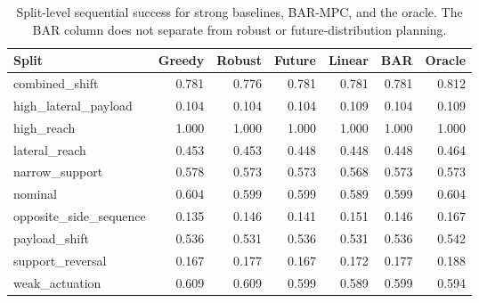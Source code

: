 \begin{table}[t]
\centering
\caption{Split-level sequential success for strong baselines, BAR-MPC, and the oracle. The BAR column does not separate from robust or future-distribution planning.}
\label{tab:selected-splits}
\scriptsize
\begin{tabular}{lrrrrrr}
\toprule
Split & Greedy & Robust & Future & Linear & BAR & Oracle \\
\midrule
combined\_shift & 0.781 & 0.776 & 0.781 & 0.781 & 0.781 & 0.812 \\
high\_lateral\_payload & 0.104 & 0.104 & 0.104 & 0.109 & 0.104 & 0.109 \\
high\_reach & 1.000 & 1.000 & 1.000 & 1.000 & 1.000 & 1.000 \\
lateral\_reach & 0.453 & 0.453 & 0.448 & 0.448 & 0.448 & 0.464 \\
narrow\_support & 0.578 & 0.573 & 0.573 & 0.568 & 0.573 & 0.573 \\
nominal & 0.604 & 0.599 & 0.599 & 0.589 & 0.599 & 0.604 \\
opposite\_side\_sequence & 0.135 & 0.146 & 0.141 & 0.151 & 0.146 & 0.167 \\
payload\_shift & 0.536 & 0.531 & 0.536 & 0.531 & 0.536 & 0.542 \\
support\_reversal & 0.167 & 0.177 & 0.167 & 0.172 & 0.177 & 0.188 \\
weak\_actuation & 0.609 & 0.609 & 0.599 & 0.589 & 0.599 & 0.594 \\
\bottomrule
\end{tabular}
\end{table}
